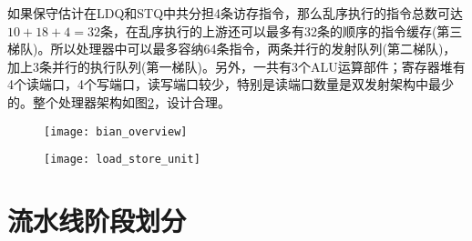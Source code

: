 如果保守估计在LDQ和STQ中共分担4条访存指令，那么乱序执行的指令总数可达$ 10+18+4 = 32 $条，在乱序执行的上游还可以最多有32条的顺序的指令缓存(第三梯队)。所以处理器中可以最多容纳64条指令，两条并行的发射队列(第二梯队)，加上3条并行的执行队列(第一梯队)。另外，一共有3个ALU运算部件；寄存器堆有4个读端口，4个写端口，读写端口较少，特别是读端口数量是双发射架构中最少的。整个处理器架构如图\ref{fig:ls_unit}，设计合理。
\begin{figure}[!htbp]
	\centering
	\texttt{[image: bian\_overview]}
	\label{fig:bian_over1}
\end{figure}

\begin{figure}[!htbp]
	\centering
	\texttt{[image: load\_store\_unit]}
	\label{fig:ls_unit}
\end{figure}

\section{流水线阶段划分}

